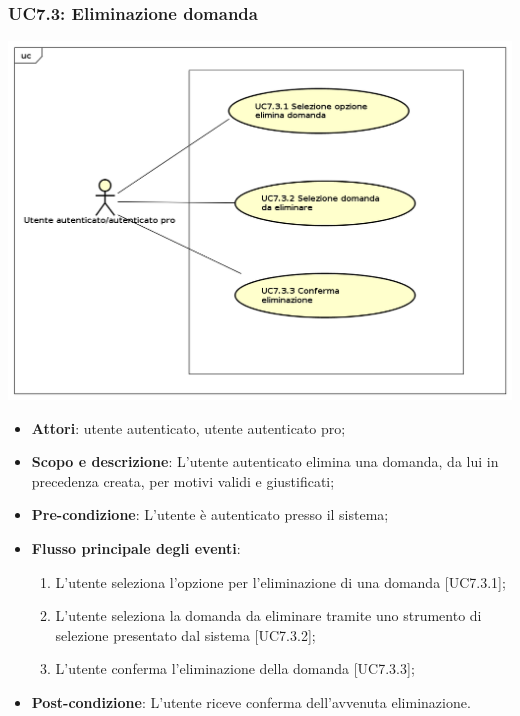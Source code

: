 	\subsubsection{UC7.3: Eliminazione domanda}	
	\begin{center}
		\includegraphics[scale=0.5]{UML/UC7.3.png}
	\end{center}
	\begin{itemize}
		\item
			\textbf{Attori}: utente autenticato, utente autenticato pro;
		\item		
			\textbf{Scopo e descrizione}: L'utente autenticato elimina una domanda, da lui in precedenza creata, per motivi validi e giustificati;
		\item
			\textbf{Pre-condizione}: L'utente è autenticato presso il sistema;
		\item
			\textbf{Flusso principale degli eventi}:
	       		\begin{enumerate}
					\item 	
					L'utente seleziona l'opzione per l'eliminazione di una domanda [UC7.3.1];
					\item
					L'utente seleziona la domanda da eliminare tramite uno strumento di selezione presentato dal sistema [UC7.3.2];
					\item
					L'utente conferma l'eliminazione della domanda [UC7.3.3];
	 			\end{enumerate}
		\item
			\textbf{	Post-condizione}: L'utente riceve conferma dell'avvenuta eliminazione.
	\end{itemize}
